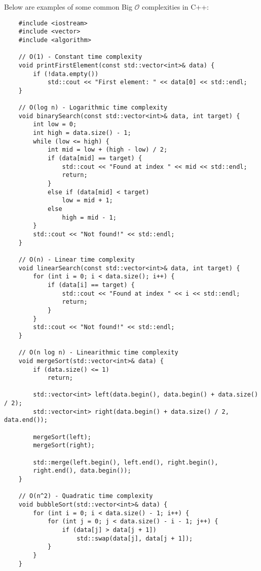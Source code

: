 \begin{solution}
    Below are examples of some common Big $\mathcal{O}$ complexities in C++: 

    \horizontalline

    \begin{verbatim}
    #include <iostream>
    #include <vector>
    #include <algorithm>

    // O(1) - Constant time complexity
    void printFirstElement(const std::vector<int>& data) {
        if (!data.empty())
            std::cout << "First element: " << data[0] << std::endl;
    }

    // O(log n) - Logarithmic time complexity
    void binarySearch(const std::vector<int>& data, int target) {
        int low = 0;
        int high = data.size() - 1;
        while (low <= high) {
            int mid = low + (high - low) / 2;
            if (data[mid] == target) {
                std::cout << "Found at index " << mid << std::endl;
                return;
            }
            else if (data[mid] < target)
                low = mid + 1;
            else
                high = mid - 1;
        }
        std::cout << "Not found!" << std::endl;
    }

    // O(n) - Linear time complexity
    void linearSearch(const std::vector<int>& data, int target) {
        for (int i = 0; i < data.size(); i++) {
            if (data[i] == target) {
                std::cout << "Found at index " << i << std::endl;
                return;
            }
        }
        std::cout << "Not found!" << std::endl;
    }

    // O(n log n) - Linearithmic time complexity
    void mergeSort(std::vector<int>& data) {
        if (data.size() <= 1)
            return;

        std::vector<int> left(data.begin(), data.begin() + data.size() / 2);
        std::vector<int> right(data.begin() + data.size() / 2, data.end());

        mergeSort(left);
        mergeSort(right);

        std::merge(left.begin(), left.end(), right.begin(), 
        right.end(), data.begin());
    }

    // O(n^2) - Quadratic time complexity
    void bubbleSort(std::vector<int>& data) {
        for (int i = 0; i < data.size() - 1; i++) {
            for (int j = 0; j < data.size() - i - 1; j++) {
                if (data[j] > data[j + 1])
                    std::swap(data[j], data[j + 1]);
            }
        }
    }


\end{verbatim}
\end{solution}
